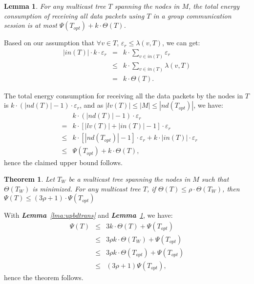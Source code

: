 \documentclass[10pt, conference, compsocconf]{IEEEtran}
\newtheorem{lemma}{\textbf{Lemma}}
\newtheorem{theorem}{\textbf{Theorem}}
\begin{document}
  \begin{lemma}
For any multicast tree $T$ spanning the nodes in $M$, the total energy consumption of receiving all data packets using $T$ in a group communication session is at most $\Psi ({T_\mathit{opt}}) + k \cdot \Theta(T)$.
    \label{lma:upbdrecv}
\end{lemma}
\begin{IEEEproof}
Based on our assumption that $\forall v \in T$, $\varepsilon _r \le \lambda(v,T)$, we can get:
\begin{eqnarray}
      |\mathit{in}(T)| \cdot k \cdot {\varepsilon _r} &=& k \cdot \sum\nolimits_{v \in \mathit{in}(T)} {{\varepsilon _r}} \nonumber \\
      &\le& k \cdot \sum\nolimits_{v \in \mathit{in}(T)} \lambda (v,T) \nonumber \\
      &=& k \cdot \Theta (T). \nonumber
    \end{eqnarray}

    The total energy consumption for receiving all the data packets by the nodes in $T$ is $k \cdot (|\mathit{nd}(T)| - 1) \cdot \varepsilon _r$, and as $|\mathit{lv}(T)|\le |M| \le |\mathit{nd}(T_\mathit{opt})|$, we have:
\begin{eqnarray}
      && k \cdot (|\mathit{nd}(T)| - 1) \cdot \varepsilon _r \nonumber \\
      &=& k \cdot \left[|\mathit{lv}(T)| + |\mathit{in}(T)| - 1\right] \cdot {\varepsilon _r} \nonumber \\
      &\le& k \cdot \left[|\mathit{nd}({T_\mathit{opt}})| - 1\right] \cdot \varepsilon _r + k \cdot |\mathit{in}(T)|\cdot \varepsilon _r \nonumber \\
      &\le& \Psi ({T_\mathit{opt}}) + k \cdot \Theta(T),
    \end{eqnarray}
hence the claimed upper bound follows.
\end{IEEEproof}

  \begin{theorem}
Let $T_W$ be a multicast tree spanning the nodes in $M$ such that $\Theta(T_W)$ is minimized. For any multicast tree $T$, if $\Theta(T)\le \rho \cdot \Theta(T_W)$, then $\Psi (T)\le (3\rho +1)\cdot \Psi(T_\mathit{opt})$
    \label{thm:relation}
\end{theorem}
\begin{IEEEproof}
With \textit{\textbf{Lemma}~\ref{lma:upbdtrans}} and \textit{\textbf{Lemma}~\ref{lma:upbdrecv}}, we have:
\begin{eqnarray}
      \Psi (T) &\le& 3k \cdot \Theta (T) + \Psi({T_\mathit{opt}}) \nonumber \\
      &\le& 3\rho k \cdot \Theta ({T_W}) + \Psi({T_\mathit{opt}}) \nonumber \\
      &\le& 3\rho k \cdot \Theta ({T_\mathit{opt}}) + \Psi(\mathit{T_{opt}}) \nonumber \\
      &\le& (3\rho + 1) \Psi(\mathit{T_{opt}}),
    \end{eqnarray}
hence the theorem follows.
\end{IEEEproof}
\end{document}
